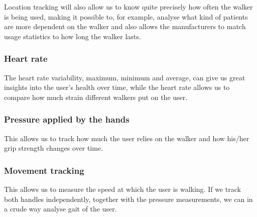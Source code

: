 Location tracking will also allow us to know quite precisely how often the walker is being used, making it possible to, for example, analyse what kind of patients are more dependent on the walker and also allows the manufacturers to match usage statistics to how long the walker lasts.

\subsubsection{Heart rate}
The heart rate variability, maximum, minimum and average, can give us great insights into the user’s health over time, while the heart rate allows us to compare how much strain different walkers put on the user.

\subsubsection{Pressure applied by the hands}
This allows us to track how much the user relies on the walker and how his/her grip strength changes over time.

\subsubsection{Movement tracking}
This allows us to measure the speed at which the user is walking. If we track both handles independently, together with the pressure measurements, we can in a crude way analyse gait of the user.



